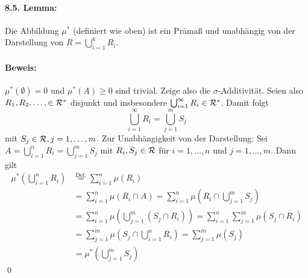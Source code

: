 \documentclass[11pt]{report}
\begin{document}
\paragraph{8.5. Lemma:} Die Abbildung $\mu^*$ (definiert wie oben) ist ein Pr\"ama\ss{} und unabh\"angig von der Darstellung von $R=\bigcup_{i=1}^k R_i$.

\paragraph{Beweis:}$\mu^*(\emptyset)=0$ und $\mu^*(A)\geq0$ sind trivial. Zeige also die $\sigma$-Additivit\"at.\newline
Seien also $R_1,R_2,\hdots,\in\mathcal{R}^*$ disjunkt und insbesondere $\bigcup_{i=1}^\infty R_i\in\mathcal{R}^*$. Damit folgt
$$\bigcup_{i=1}^\infty R_i=\bigcup_{j=1}^m S_j$$
mit $S_j\in\mathcal{R},j=1,\hdots,m$. 
\newline
Zur Unabh\"angigkeit von der Darstellung: Sei $A=\bigcup_{i=1}^n R_i=\bigcup_{j=1}^mS_j$ mit $R_i,S_j\in\mathcal{R}$ f\"ur $i=1,\hdots,n$ und $j=1,\hdots,m$. Dann gilt
\begin{align*}
    \mu^*\left(\bigcup_{i=1}^nR_i\right)&\overset{\text{Def.}}{=}\sum_{i=1}^n\mu(R_i)\\
    &=\sum_{i=1}^n\mu(R_i\cap A)
    =\sum_{i=1}^n\mu\left(R_i\cap \bigcup_{j=1}^mS_j\right) \\
    &=\sum_{i=1}^n\mu\left(\bigcup_{j=1}^m(S_j\cap R_i)\right)
    =\sum_{i=1}^n\sum_{j=1}^m\mu\left(S_j\cap R_i\right)\\
    &=\sum_{j=1}^m\mu\left(S_j\cap \bigcup_{i=1}^nR_i\right)=\sum_{j=1}^m\mu(S_j)\\
    &=\mu^*\left(\bigcup_{j=1}^mS_j\right)
\end{align*}
\qed

\end{document}
